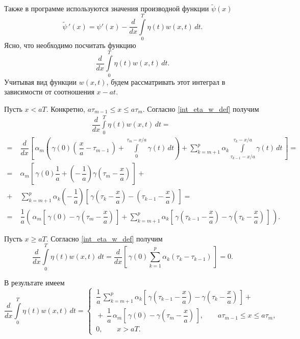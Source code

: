 \documentclass{article}
\renewcommand{\le}{\leqslant}
\renewcommand{\ge}{\geqslant}
\theoremstyle{definition}
\begin{document}
Также в программе используются значения производной функции $\widetilde{\psi}(x)$
\begin{equation} \label{d_tilde_psi}
	\widetilde{\psi}\,'(x) = \psi'(x) - \dfrac{d}{dx}\int\limits_0^T \eta(t)w(x,t) \,dt.
\end{equation}
Ясно, что необходимо посчитать функцию 
\begin{equation*}
	\dfrac{d}{dx}\int\limits_0^T \eta(t)w(x,t) \,dt.
\end{equation*}
Учитывая вид функции $w(x,t)$, будем рассматривать этот интеграл в зависимости от 
соотношения $x - at$.

Пусть $x < aT$. Конкретно, $a\tau_{m - 1} \le x \le a\tau_m$. Согласно \eqref{int_eta_w_def} получим
\begin{equation*}
\begin{aligned}
	& \phantom{----------} \dfrac{d}{dx}\int\limits_0^T \eta(t)w(x,t) \,dt = \\[3mm]
	=\; & \dfrac{d}{dx}\left[\, \alpha_m \!\!\left(\, \gamma(0)\!\left(\, \dfrac{x}{a} - \tau_{m - 1} \,\right) +
	\int\limits_{0}^{\tau_m - x/a}\! \gamma(t) \,dt \right) +
	\sum\limits_{k = m + 1}^{p}\! \alpha_k \!\!\int\limits_{\tau_{k - 1} - x/a}^{\tau_k - x/a}\!\! \gamma(t) \,dt \,\right] = \\[3mm] 
	=\; & \alpha_m \left[\, \gamma(0)\dfrac{1}{a} + \left(-\,\dfrac{1}{a}\right)\gamma\!\left(\tau_m - \dfrac{x}{a}\right) \,\right]
	+ \\[3mm] +\, & \sum\limits_{k = m + 1}^{p} \alpha_k \left(-\,\dfrac{1}{a}\right) \left[\,
	\gamma\left(\tau_k - \dfrac{x}{a}\right) - \left(\tau_{k - 1} - \dfrac{x}{a}\right) \,\right] = \\[3mm]
	=\; & \dfrac{1}{a} \left(\, \alpha_m \left[\, \gamma(0) -
	\gamma\!\left(\tau_m - \dfrac{x}{a}\right) \,\right] + \sum\limits_{k = m + 1}^{p} \alpha_k \left[\,\gamma\left(\tau_{k - 1} - \dfrac{x}{a}\right) - \gamma\left(\tau_k - \dfrac{x}{a}\right) \,\right] \,\right).
\end{aligned}
\end{equation*}

Пусть $x \ge aT$. Согласно \eqref{int_eta_w_def} получим
\begin{equation*}
	\dfrac{d}{dx}\int\limits_0^T \eta(t)w(x,t) \,dt = 
	\dfrac{d}{dx} \left[\, \gamma(0)\sum\limits_{k = 1}^{p} \alpha_k(\tau_k - \tau_{k - 1}) \,\right] = 0.
\end{equation*}

В результате имеем
\begin{equation} \label{d_int_eta_w_def}
\dfrac{d}{dx}\int\limits_0^T \eta(t)w(x,t) \,dt = 
	\begin{cases}
		\, \dfrac{1}{a} \,\sum\limits_{k = m + 1}^{p} \alpha_k \left[\,\gamma\left(\tau_{k - 1} - \dfrac{x}{a}\right) - \gamma\left(\tau_k - \dfrac{x}{a}\right) \,\right] + \\[7mm]
		\, +\;\dfrac{1}{a}\,\alpha_m \left[\, \gamma(0) -\gamma\!\left(\tau_m - \dfrac{x}{a}\right) \,\right], \qquad
		a\tau_{m - 1} \le x \le a\tau_m, \\[5mm]
		\, 0, \qquad x > aT.
	\end{cases}
\end{equation}
\end{document}
